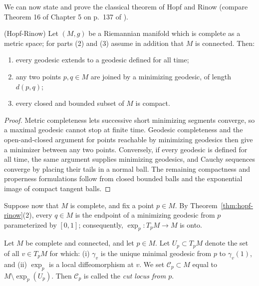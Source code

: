 We can now state and prove the classical theorem of Hopf and Rinow
(compare Theorem 16 of Chapter 5 on p.~137 of \cite{Petersen}).

\begin{theorem}
\label{thm:hopf-rinow}
\leanok

(Hopf-Rinow) Let $(M,g)$ be a Riemannian manifold which is
complete as a metric space; for parts (2) and (3) assume in
addition that $M$ is connected. Then:
\begin{enumerate}
\item every geodesic extends to a geodesic defined for all time;
\item any two points $p,q\in M$ are joined by a minimizing
geodesic, of length $d(p,q)$;
\item every closed and bounded subset of $M$ is compact.
\end{enumerate}
\end{theorem}

\begin{proof}
  \leanok
\sketch
{}
Metric completeness lets successive short minimizing segments converge, so a maximal geodesic cannot stop at finite time. Geodesic completeness and the open-and-closed argument for points reachable by minimizing geodesics then give a minimizer between any two points. Conversely, if every geodesic is defined for all time, the same argument supplies minimizing geodesics, and Cauchy sequences converge by placing their tails in a normal ball. The remaining compactness and properness formulations follow from closed bounded balls and the exponential image of compact tangent balls.
\end{proof}

Suppose now that $M$ is complete, and fix a point $p\in M$. By
Theorem~\ref{thm:hopf-rinow}(2), every $q\in M$ is the endpoint
of a minimizing geodesic from $p$ parameterized by $[0,1]$;
consequently, $\exp_p\colon T_pM\to M$ is onto.

\begin{definition}
\label{def:cut-locus}
\leanok

Let $M$ be complete and connected, and let $p\in M$. Let $U_p\subset T_pM$ denote
the set of all $v\in T_pM$ for which: (i) $\gamma_v$ is the unique
minimal geodesic from $p$ to $\gamma_v(1)$, and (ii) $\exp_p$ is
a local diffeomorphism at $v$. We set ${\mathcal C}_p\subset M$
equal to $M\setminus \exp_p(U_p)$. Then ${\mathcal C}_p$ is
called the {\sl cut locus from $p$}.
\end{definition}

